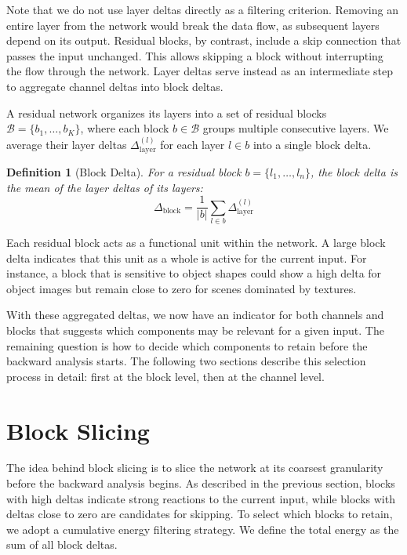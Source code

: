 \documentclass[
12pt,
fancyheadings,
a4paper,
twoside,
BCOR=0.7cm,
nobcorignoretitle,
grayscalebody,
]{stsreprt}
\newtheorem{definition}{Definition}[chapter]
\begin{document}
Note that we do not use layer deltas directly as a filtering criterion.
Removing an entire layer from the network would break the data flow, as subsequent layers depend on
its output.
Residual blocks, by contrast, include a skip connection that passes the input unchanged.
This allows skipping a block without interrupting the flow through the network.
Layer deltas serve instead as an intermediate step to aggregate channel deltas into block deltas.

A residual network organizes its layers into a set of residual blocks $\mathcal{B} = \{b_1, \dots,
b_K\}$, where each block $b \in \mathcal{B}$ groups multiple consecutive layers.
We average their layer deltas $\Delta_{\text{layer}}^{(l)}$ for each layer $l \in b$ into a single
block delta.

\begin{definition}[Block Delta]
For a residual block $b = \{l_1, \dots, l_n\}$, the \textit{block delta} is the mean of the layer
deltas of its layers:
\begin{equation}
    \Delta_{\text{block}} = \frac{1}{|b|} \sum_{l \in b} \Delta_{\text{layer}}^{(l)}
\end{equation}
\end{definition}
Each residual block acts as a functional unit within the network.
A large block delta indicates that this unit as a whole is active for the current input.
For instance, a block that is sensitive to object shapes could show a high delta for object images
but remain close to zero for scenes dominated by textures.

With these aggregated deltas, we now have an indicator for both channels and blocks that suggests
which components may be relevant for a given input.
The remaining question is how to decide which components to retain before the backward analysis
starts.
The following two sections describe this selection process in detail: first at the block level,
then at the channel level.

\section{Block Slicing}
\label{sec:block_slicing}

The idea behind block slicing is to slice the network at its coarsest granularity before the
backward analysis begins.
As described in the previous section, blocks with high deltas indicate strong reactions to the
current input, while blocks with deltas close to zero are candidates for skipping.
To select which blocks to retain, we adopt a cumulative energy filtering strategy.
We define the total energy as the sum of all block deltas.
\end{document}
